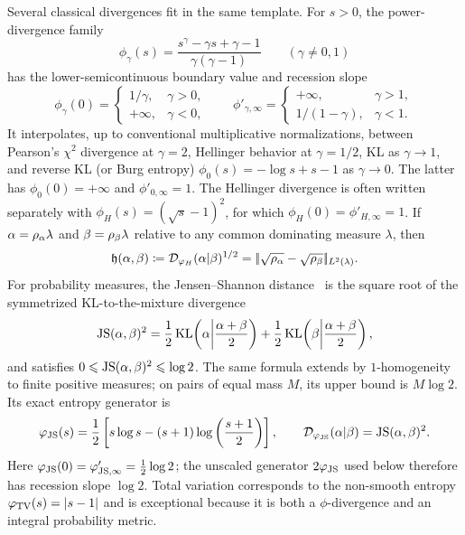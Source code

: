 Several classical divergences fit in the same template. For $s>0$, the power-divergence family
\[
	\phi_\gamma(s)=\frac{s^\gamma-\gamma s+\gamma-1}{\gamma(\gamma-1)}
	\qquad(\gamma\neq0,1)
\]
has the lower-semicontinuous boundary value and recession slope
\[
	\phi_\gamma(0)=
	\begin{cases}1/\gamma,&\gamma>0,\\+\infty,&\gamma<0,\end{cases}
	\qquad
	\phi'_{\gamma,\infty}=
	\begin{cases}+\infty,&\gamma>1,\\1/(1-\gamma),&\gamma<1.\end{cases}
\]
It interpolates, up to conventional multiplicative normalizations, between Pearson's $\chi^2$ divergence at $\gamma=2$, Hellinger behavior at $\gamma=1/2$, KL as $\gamma\to1$, and reverse KL (or Burg entropy) $\phi_0(s)=-\log s+s-1$ as $\gamma\to0$. The latter has $\phi_0(0)=+\infty$ and $\phi'_{0,\infty}=1$. The Hellinger divergence is often written separately with $\phi_H(s)=(\sqrt s-1)^2$, for which $\phi_H(0)=\phi'_{H,\infty}=1$. If $\alpha=\rho_\alpha\lambda$ and $\beta=\rho_\beta\lambda$ relative to any common dominating measure $\lambda$, then
\[
	\mathfrak{h}(\alpha,\beta)
	\coloneqq\mathcal{D}_{\varphi_H}(\alpha|\beta)^{1/2}
	=|\!| \sqrt{\rho_\alpha}-\sqrt{\rho_\beta} |\!|_{L^2(\lambda)}.
\]
For probability measures, the Jensen--Shannon distance~\cite{endres2003new,osterreicher2003new} is the square root of the symmetrized KL-to-the-mixture divergence
\[
	\operatorname{JS}(\alpha,\beta)^2
	=
	\frac12\operatorname{KL}\!\left(\alpha\middle|\frac{\alpha+\beta}{2}\right)
	+
	\frac12\operatorname{KL}\!\left(\beta\middle|\frac{\alpha+\beta}{2}\right),
\]
and satisfies $0\leqslant\operatorname{JS}(\alpha,\beta)^2\leqslant\log 2$. The same formula extends by $1$-homogeneity to finite positive measures; on pairs of equal mass $M$, its upper bound is $M\log 2$. Its exact entropy generator is
\[
	\varphi_{\operatorname{JS}}(s)
	=\frac12\left[s\log s-(s+1)\log\left( \frac{s+1}{2} \right)\right],
	\qquad
	\mathcal{D}_{\varphi_{\operatorname{JS}}}(\alpha|\beta)=\operatorname{JS}(\alpha,\beta)^2.
\]
Here $\varphi_{\operatorname{JS}}(0)=\varphi'_{\operatorname{JS},\infty}=\frac12\log 2$; the unscaled generator $2\varphi_{\operatorname{JS}}$ used below therefore has recession slope $\log 2$.
Total variation corresponds to the non-smooth entropy $\varphi_{\operatorname{TV}}(s)=|s-1|$ and is exceptional because it is both a $\phi$-divergence and an integral probability metric.

